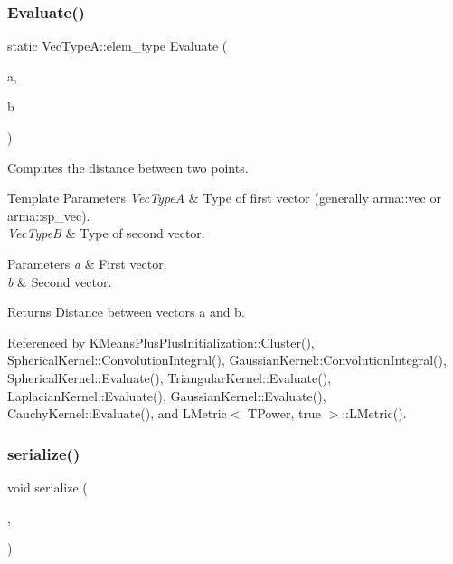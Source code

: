\subsubsection{Evaluate()}
{\footnotesize\ttfamily static Vec\+Type\+A\+::elem\+\_\+type Evaluate (\begin{DoxyParamCaption}\item[{const Vec\+TypeA \&}]{a,  }\item[{const Vec\+TypeB \&}]{b }\end{DoxyParamCaption})\hspace{0.3cm}{\ttfamily [static]}}



Computes the distance between two points. 


\begin{DoxyTemplParams}{Template Parameters}
{\em Vec\+TypeA} & Type of first vector (generally arma\+::vec or arma\+::sp\+\_\+vec). \\
\hline
{\em Vec\+TypeB} & Type of second vector. \\
\hline
\end{DoxyTemplParams}

\begin{DoxyParams}{Parameters}
{\em a} & First vector. \\
\hline
{\em b} & Second vector. \\
\hline
\end{DoxyParams}
\begin{DoxyReturn}{Returns}
Distance between vectors a and b. 
\end{DoxyReturn}


Referenced by K\+Means\+Plus\+Plus\+Initialization\+::\+Cluster(), Spherical\+Kernel\+::\+Convolution\+Integral(), Gaussian\+Kernel\+::\+Convolution\+Integral(), Spherical\+Kernel\+::\+Evaluate(), Triangular\+Kernel\+::\+Evaluate(), Laplacian\+Kernel\+::\+Evaluate(), Gaussian\+Kernel\+::\+Evaluate(), Cauchy\+Kernel\+::\+Evaluate(), and L\+Metric$<$ T\+Power, true $>$\+::\+L\+Metric().

\mbox{\label{classmlpack_1_1metric_1_1LMetric_aa2ccb5a0533a6ba0abe6dfc1f98fbafb}} 
\subsubsection{serialize()}
{\footnotesize\ttfamily void serialize (\begin{DoxyParamCaption}\item[{Archive \&}]{,  }\item[{const uint32\+\_\+t}]{ }\end{DoxyParamCaption})\hspace{0.3cm}{\ttfamily [inline]}}



